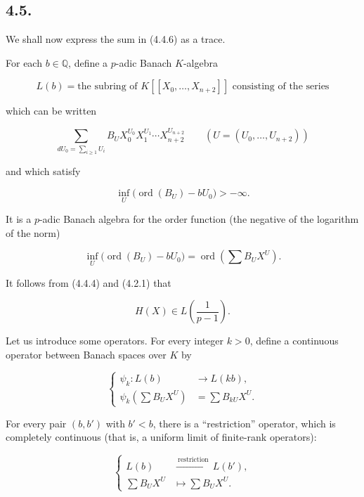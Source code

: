 \subsection*{4.5.}
We shall now express the sum in (4.4.6) as a trace.

For each $b\in\mathbb Q$, define a $p$-adic Banach $K$-algebra

\begin{equation}\tag{4.5.1}
L(b)=\text{the subring of $K[[X_0,\ldots,X_{n+2}]]$ consisting of the
series}
\end{equation}

which can be written

\begin{equation}\tag{4.5.2}
\sum_{dU_0=\sum_{i\geq1}U_i}
B_UX_0^{U_0}X_1^{U_1}\cdots X_{n+2}^{U_{n+2}}
\qquad (U=(U_0,\ldots,U_{n+2}))
\end{equation}

and which satisfy

\begin{equation}\tag{4.5.3}
\inf_U\bigl(\operatorname{ord}(B_U)-bU_0\bigr)>-\infty.
\end{equation}

It is a $p$-adic Banach algebra for the order function (the negative of the
logarithm of the norm)

\begin{equation}\tag{4.5.4}
\inf_U\bigl(\operatorname{ord}(B_U)-bU_0\bigr)
=\operatorname{ord}\!\left(\sum B_UX^U\right).
\end{equation}

It follows from (4.4.4) and (4.2.1) that

\[
H(X)\in L\!\left(\frac1{p-1}\right).
\]

Let us introduce some operators. For every integer $k>0$, define a
continuous operator between Banach spaces over $K$ by

\begin{equation}\tag{4.5.5}
\left\{
\begin{aligned}
\psi_k:L(b)&\longrightarrow L(kb),\\
\psi_k\!\left(\sum B_UX^U\right)&=\sum B_{kU}X^U.
\end{aligned}
\right.
\end{equation}

For every pair $(b,b')$ with $b'<b$, there is a ``restriction'' operator,
which is completely continuous (that is, a uniform limit of finite-rank
operators):

\begin{equation}\tag{4.5.6}
\left\{
\begin{aligned}
L(b)&\xrightarrow{\ \text{restriction}\ }L(b'),\\
\sum B_UX^U&\longmapsto\sum B_UX^U.
\end{aligned}
\right.
\end{equation}

